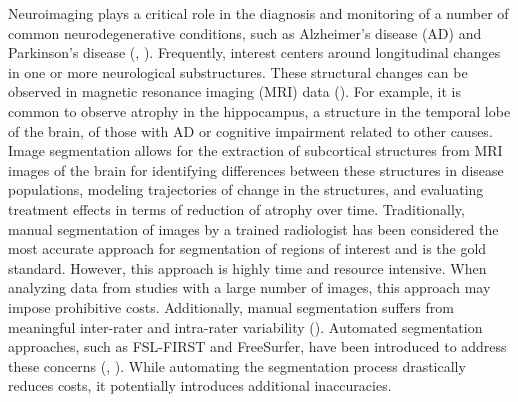\documentclass[11pt,reqno]{article}
\theoremstyle{definition}
\begin{document}
Neuroimaging plays a critical role in the diagnosis and monitoring of a number of common neurodegenerative conditions, such as Alzheimer's disease (AD) and Parkinson's disease (\cite{knopmanAlzheimerDisease2021}, \cite{poeweParkinsonDisease2017}). Frequently, interest centers around longitudinal changes in one or more neurological substructures. These structural changes can be observed in magnetic resonance imaging (MRI) data (\cite{crainiceanu2016tutorial}). For example, it is common to observe atrophy in the hippocampus, a structure in the temporal lobe of the brain, of those with AD or cognitive impairment related to other causes. Image segmentation allows for the extraction of subcortical structures from MRI images of the brain for identifying differences between these structures in disease populations, modeling trajectories of change in the structures, and evaluating treatment effects in terms of reduction of atrophy over time. Traditionally, manual segmentation of images by a trained radiologist has been considered the most accurate approach for segmentation of regions of interest and is the gold standard. However, this approach is highly time and resource intensive. When analyzing data from studies with a large number of images, this approach may impose prohibitive costs. Additionally, manual segmentation suffers from meaningful inter-rater and intra-rater variability (\cite{boccardiSurveyProtocolsManual2011}). Automated segmentation approaches, such as FSL-FIRST and FreeSurfer, have been introduced to address these concerns (\cite{patenaudeBayesianModelShape2011}, \cite{reuterWithinsubjectTemplateEstimation2012}). While automating the segmentation process drastically reduces costs, it potentially introduces additional inaccuracies.
\end{document}
